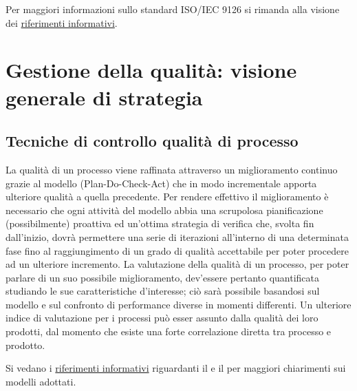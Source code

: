 \documentclass[a4paper, titlepage]{article}
\begin{document}
Per maggiori informazioni sullo standard ISO/IEC 9126 si rimanda alla visione dei \hyperref[rifinfo] {riferimenti informativi}.

\newpage
\section{Gestione della qualità: visione generale di strategia}

\subsection{Tecniche di controllo qualità di processo}
La qualità di un processo viene raffinata attraverso un miglioramento continuo grazie al modello  (Plan-Do-Check-Act) che in modo incrementale apporta ulteriore qualità a quella precedente. Per rendere effettivo il miglioramento è necessario che ogni attività del modello abbia una scrupolosa pianificazione (possibilmente) proattiva ed un'ottima strategia di verifica che, svolta fin dall'inizio, dovrà permettere una serie di iterazioni all'interno di una determinata fase fino al raggiungimento di un grado di qualità accettabile per poter procedere ad un ulteriore incremento.
\newline La valutazione della qualità di un processo, per poter parlare di un suo possibile miglioramento, dev'essere pertanto quantificata studiando le sue caratteristiche d'interesse; ciò sarà possibile basandosi sul modello  e sul confronto di performance diverse in momenti differenti.
\newline Un ulteriore indice di valutazione per i processi può esser assunto dalla qualità dei loro prodotti, dal momento che esiste una forte correlazione diretta tra processo e prodotto.

Si vedano i \hyperref[rifinfo]{riferimenti informativi} riguardanti il  e il  per maggiori chiarimenti sui modelli adottati.
\end{document}
